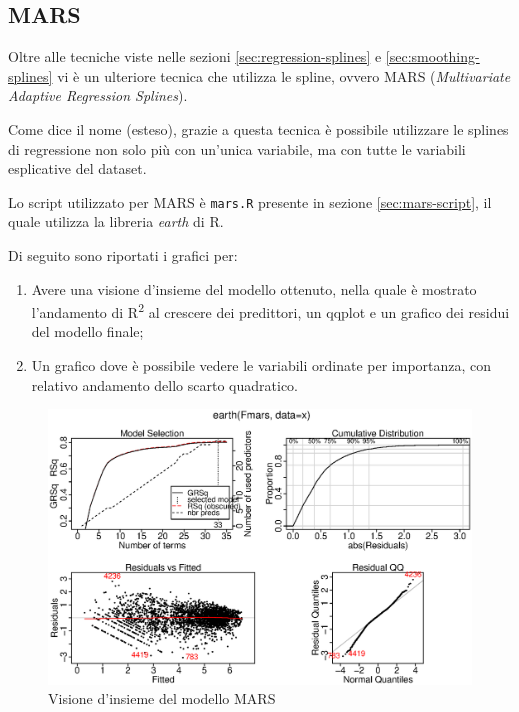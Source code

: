 
\subsection{MARS}\label{sec:mars}
Oltre alle tecniche viste nelle sezioni \ref{sec:regression-splines} e
\ref{sec:smoothing-splines} vi è un ulteriore tecnica che utilizza le spline,
ovvero MARS (\emph{Multivariate Adaptive Regression Splines}).

Come dice il nome (esteso), grazie a questa tecnica è possibile utilizzare le
splines di regressione non solo più con un'unica variabile, ma con tutte le
variabili esplicative del dataset.

Lo script utilizzato per MARS è \texttt{mars.R} presente in sezione
\ref{sec:mars-script}, il quale utilizza la libreria \emph{earth} di R.

Di seguito sono riportati i grafici per:

\begin{enumerate}
\item Avere una visione d'insieme del modello ottenuto, nella quale è mostrato
  l'andamento di R\textsuperscript{2} al crescere dei predittori, un qqplot e
  un grafico dei residui del modello finale;
\item Un grafico dove è possibile vedere le variabili ordinate per importanza,
  con relativo andamento dello scarto quadratico.
\end{enumerate}

\begin{figure}[H]
  \centering
  \includegraphics[width=.7\columnwidth]{images/non-linear/mars-general.eps}
  \caption{Visione d'insieme del modello MARS}
  \label{fig:tree-1}
\end{figure}

